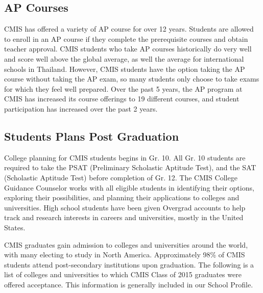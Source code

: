 
\subsection{AP Courses}

CMIS has offered a variety of AP course for over 12 years. Students are allowed to enroll in an AP course if they complete the prerequisite courses and obtain teacher approval.  CMIS students who take AP courses historically do very well and score well above the global average, as well the average for international schools in Thailand.  However, CMIS students have the option taking the AP course without taking the AP exam, so many students only choose to take exams for which they feel well prepared.  Over the past 5 years, the AP program at CMIS has increased its course offerings to 19 different courses, and student participation has increased over the past 2 years.


\subsection{Students Plans Post Graduation}

College planning for CMIS students begins in Gr. 10.  All Gr. 10 students are required to take the PSAT (Preliminary Scholastic Aptitude Test), and the SAT (Scholastic Aptitude Test) before completion of Gr. 12.  The CMIS College Guidance Counselor works with all eligible students in identifying their options, exploring their possibilities, and planning their applications to colleges and universities.  High school students have been given Overgrad accounts to help track and research interests in careers and universities, mostly in the United States.  



CMIS graduates gain admission to colleges and universities around the world, with many electing to study in North America. Approximately 98\% of CMIS students attend post­-secondary institutions upon graduation. The following is a list of colleges and universities to which CMIS Class of 2015 graduates were offered acceptance.  This information is generally included in our School Profile.


